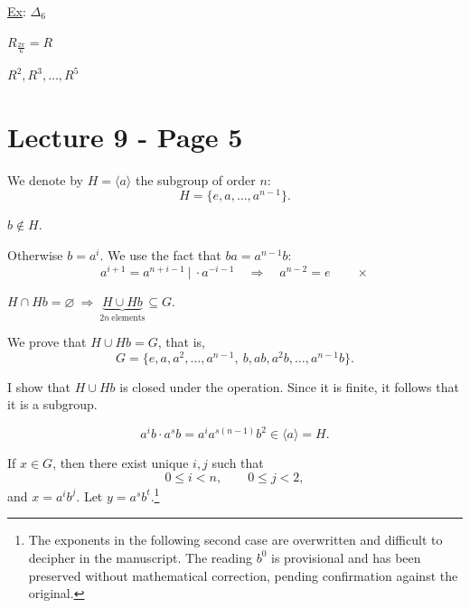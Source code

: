 \bigskip
\bigskip
\noindent\underline{Ex}: \quad $\Delta_6$

\begin{center}
\end{center}

\noindent $R_{\frac{2\pi}{6}} = R$

\noindent $R^2, R^3,\ldots,R^5$






\section*{Lecture 9 - Page 5}

\noindent We denote by $H=\langle a\rangle$ the subgroup of order $n$:
\[
H=\{e,a,\ldots,a^{n-1}\}.
\]

\noindent $b\notin H$.

\noindent Otherwise $b=a^i$. We use the fact that $ba=a^{n-1}b$:
\[
a^{i+1}=a^{n+i-1}\ \big|\ \cdot a^{-i-1}
\quad\Longrightarrow\quad a^{n-2}=e\qquad\times
\]

\bigskip
\noindent $H\cap Hb=\varnothing\ \Longrightarrow\ \underbrace{H\cup Hb}_{2n\ \text{elements}}\subseteq G$.

\bigskip
\noindent We prove that $H\cup Hb=G$, that is,
\[
G=\{e,a,a^2,\ldots,a^{n-1},\ b,ab,a^2b,\ldots,a^{n-1}b\}.
\]

\noindent I show that $H\cup Hb$ is closed under the operation. Since it is finite,
it follows that it is a subgroup.

\[
a^i b\cdot a^s b=a^i a^{s(n-1)}b^2\in\langle a\rangle=H.
\]

\bigskip
\noindent If $x\in G$, then there exist unique $i,j$ such that
\[
0\leq i<n,\qquad 0\leq j<2,
\]
\noindent and $x=a^i b^j$. Let $y=a^s b^t$.\footnote{The exponents in the following second case are overwritten and difficult to decipher in the manuscript. The reading $b^0$ is provisional and has been preserved without mathematical correction, pending confirmation against the original.}

